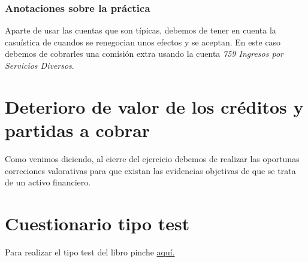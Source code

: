 \documentclass[a4paper,12pt]{article}
\begin{document}
\subsubsection*{Anotaciones sobre la práctica}

Aparte de usar las cuentas que son típicas, debemos de tener en cuenta la casuística de cuandos se renegocian unos efectos y se aceptan. En este caso debemos de cobrarles una comisión extra usando la cuenta \textit{759 Ingresos por Servicios Diversos}.


\section{Deterioro de valor de los créditos y partidas a cobrar}

Como venimos diciendo, al cierre del ejercicio debemos de realizar las oportunas correciones valorativas para que existan las evidencias objetivas de que se trata de un activo financiero.



\newpage
\section{Cuestionario tipo test}
Para realizar el tipo test del libro pinche \href{https://elblogdeismael.github.io/Asignaturas/Tercer%20A%C3%B1o/CF1/Tests/testT3Libro.html}{aquí.}
\end{document}
